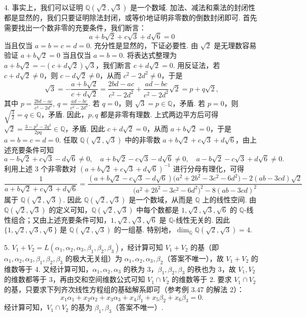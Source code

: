 \documentclass[UTF8,12pt,a4paper,fontset=fandol]{ctexart}
\begin{document}
4. 事实上，我们可以证明 $\mathbb{Q}(\sqrt{2},\sqrt{3})$ 是一个数域. 加法、减法和乘法的封闭性都是显然的，我们只要证明除法封闭，或等价地证明非零数的倒数封闭即可. 首先需要找出一个数非零的充要条件，我们断言：
\[
a+b\sqrt{2}+c\sqrt{3}+d\sqrt{6}=0
\]
当且仅当 $a=b=c=d=0$. 充分性是显然的，下证必要性. 由 $\sqrt{2}$ 是无理数容易验证 $a+b\sqrt{2}=0$ 当且仅当 $a=b=0$. 将表达式整理为 $a+b\sqrt{2}=-(c+d\sqrt{2})\sqrt{3}$，我们断言 $c+d\sqrt{2}=0$. 用反证法，若 $c+d\sqrt{2}\ne 0$，则 $c-d\sqrt{2}\ne 0$，从而 $c^2-2d^2\ne 0$，于是
\[
\sqrt{3}=-\frac{a+b\sqrt{2}}{c+d\sqrt{2}}
=\frac{2bd-ac}{c^2-2d^2}+\frac{ad-bc}{c^2-2d^2}\sqrt{2}=p+q\sqrt{2},
\]
其中 $p=\frac{2bd-ac}{c^2-2d^2}$, $q=\frac{ad-bc}{c^2-2d^2}$. 若 $q=0$，则 $\sqrt{3}=p\in\mathbb{Q}$，矛盾. 若 $p=0$，则 $\sqrt{\frac{3}{2}}=q\in\mathbb{Q}$，矛盾. 因此，$p,q$ 都是非零有理数. 上式两边平方后可得 $\sqrt{2}=\frac{3-p^2-2q^2}{2pq}\in\mathbb{Q}$，矛盾. 因此 $c+d\sqrt{2}=0$，从而 $a+b\sqrt{2}=0$，于是 $a=b=c=d=0$. 任取 $\mathbb{Q}(\sqrt{2},\sqrt{3})$ 中的非零数 $a+b\sqrt{2}+c\sqrt{3}+d\sqrt{6}$，由上述充要条件可知
\[
a-b\sqrt{2}+c\sqrt{3}-d\sqrt{6}\ne 0,\quad
a+b\sqrt{2}-c\sqrt{3}-d\sqrt{6}\ne 0,\quad
a-b\sqrt{2}-c\sqrt{3}+d\sqrt{6}\ne 0.
\]
利用上述 3 个非零数对 $(a+b\sqrt{2}+c\sqrt{3}+d\sqrt{6})^{-1}$ 进行分母有理化，可得
\[
\frac{1}{a+b\sqrt{2}+c\sqrt{3}+d\sqrt{6}}
=\frac{(a+b\sqrt{2}-c\sqrt{3}-d\sqrt{6})\bigl(a^2+2b^2-3c^2-6d^2\bigr)-2(ab-3cd)\sqrt{2}}{\bigl(a^2+2b^2-3c^2-6d^2\bigr)^2-8(ab-3cd)^2}
\]
属于 $\mathbb{Q}(\sqrt{2},\sqrt{3})$. 因此 $\mathbb{Q}(\sqrt{2},\sqrt{3})$ 是一个数域，从而是 $\mathbb{Q}$ 上的线性空间. 由 $\mathbb{Q}(\sqrt{2},\sqrt{3})$ 的定义可知，$\mathbb{Q}(\sqrt{2},\sqrt{3})$ 中每个数都是 $1,\sqrt{2},\sqrt{3},\sqrt{6}$ 的 $\mathbb{Q}$-线性组合；又由上述充要条件可知，$1,\sqrt{2},\sqrt{3},\sqrt{6}$ 是 $\mathbb{Q}$-线性无关的. 因此 $\{1,\sqrt{2},\sqrt{3},\sqrt{6}\}$ 是 $\mathbb{Q}(\sqrt{2},\sqrt{3})$ 的一组基. 特别地，$\dim_{\mathbb{Q}}\mathbb{Q}(\sqrt{2},\sqrt{3})=4$.

5. $V_1+V_2=L(\alpha_1,\alpha_2,\alpha_3,\beta_1,\beta_2,\beta_3)$，经计算可知 $V_1+V_2$ 的基（即 $\alpha_1,\alpha_2,\alpha_3,\beta_1,\beta_2,\beta_3$ 的极大无关组）为 $\alpha_1,\alpha_2,\alpha_3,\beta_2$（答案不唯一），故 $V_1+V_2$ 的维数等于 4. 又经计算可知，$\alpha_1,\alpha_2,\alpha_3$ 的秩为 3，$\beta_1,\beta_2,\beta_3$ 的秩也为 3，故 $V_1,V_2$ 的维数都等于 3，再由交和空间维数公式可知 $V_1\cap V_2$ 的维数等于 2. 要求 $V_1\cap V_2$ 的基，只要求下列齐次线性方程组的基础解系即可（参考例 3.47 的解法 2）：
\[
x_1\alpha_1+x_2\alpha_2+x_3\alpha_3+x_4\beta_1+x_5\beta_2+x_6\beta_3=0.
\]
经计算可知，$V_1\cap V_2$ 的基为 $\beta_1,\beta_3$（答案不唯一）.
\end{document}
